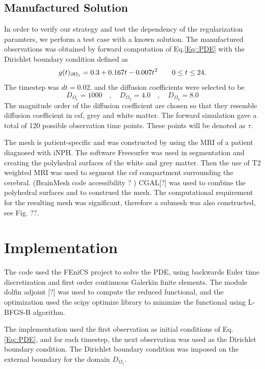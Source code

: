 \documentclass[11pt,a4paper]{article}
\begin{document}
\subsection*{Manufactured Solution}
In order to verify our strategy and test the dependency of the
regularization paramters, we perform a test case with a
known solution.  
The manufactured observations was obtained by forward computation of Eq.\ref{Eq::PDE} with the Dirichlet boundary condition defined as
\begin{equation}
g(t)_{\partial \Omega_1} = 0.3 +0.167t - 0.007t\sp{2} \qquad  0 \leq t \leq 24.
\label{EQ::DIRI}
\end{equation}
The timestep was $dt = 0.02$, and the diffusion coefficients were selected to be 
\begin{equation}
D_{\Omega_1} = 1000 \quad , \quad D_{\Omega_2} = 4.0 \quad , \quad D_{\Omega_3} = 8.0 
\end{equation}  
The magnitude order of the diffusion coefficient are chosen so that they resemble diffusion coefficient in csf, grey and white matter. The forward simulation gave a total of 120 possible observation time points. These points 
will be denoted as $\tau$.

The mesh is patient-specific and was constructed by using the MRI of a patient diagnosed with iNPH. The software Freesurfer was used in segmentation and creating the polyhedral surfaces of the white and grey matter. Then the use of T2 weighted MRI was used to segment the csf compartment surrounding the cerebral. (BrainMesh code accessibility ? ) CGAL[?] was used to combine the polyhedral surfaces and to construed the mesh. The computational requirement for the resulting mesh was significant, therefore a submesh was also constructed, see Fig. ??. 


\section*{Implementation}
The code used the FEniCS project to solve the PDE, using backwards Euler time discretization and first order continuous Galerkin finite elements. The module dolfin adjoint [?] was used to compute the reduced functional, and the optimization used the scipy optimize library to minimize the functional using L-BFGS-B algorithm.   

The implementation used the first observation as initial conditions of Eq.\ref{Eq::PDE}, and for each timestep, the next observation was used as the Dirichlet boundary condition. The Dirichlet boundary condition was imposed on the external boundary for the domain $D_{\Omega_1}$. 
\end{document}
